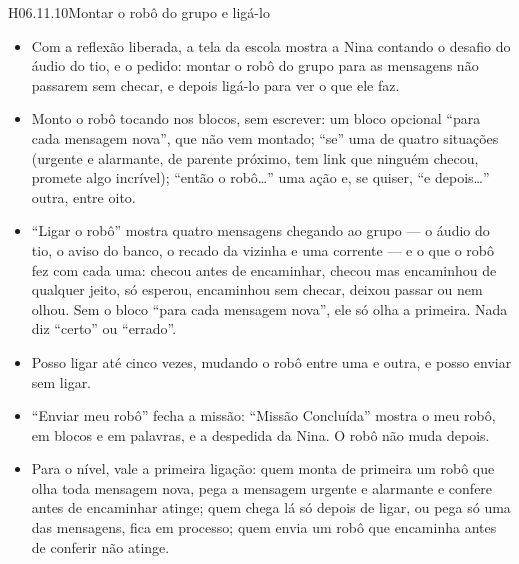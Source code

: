 \begin{historia}{H06.11.10}{Montar o robô do grupo e ligá-lo}{\parcial}
\aceite
\begin{itemize}
  \item Com a reflexão liberada, a tela da escola mostra a Nina contando o
    desafio do áudio do tio, e o pedido: montar o robô do grupo para as
    mensagens não passarem sem checar, e depois ligá-lo para ver o que ele
    faz.
  \item Monto o robô tocando nos blocos, sem escrever: um bloco opcional
    \enquote{para cada mensagem nova}, que não vem montado; \enquote{se} uma
    de quatro situações (urgente e alarmante, de parente próximo, tem link
    que ninguém checou, promete algo incrível); \enquote{então o robô\ldots}
    uma ação e, se quiser, \enquote{e depois\ldots} outra, entre oito.
  \item \enquote{Ligar o robô} mostra quatro mensagens chegando ao grupo --- o
    áudio do tio, o aviso do banco, o recado da vizinha e uma corrente --- e o
    que o robô fez com cada uma: checou antes de encaminhar, checou mas
    encaminhou de qualquer jeito, só esperou, encaminhou sem checar, deixou
    passar ou nem olhou. Sem o bloco \enquote{para cada mensagem nova}, ele
    só olha a primeira. Nada diz \enquote{certo} ou \enquote{errado}.
  \item Posso ligar até cinco vezes, mudando o robô entre uma e outra, e
    posso enviar sem ligar.
  \item \enquote{Enviar meu robô} fecha a missão: \enquote{Missão Concluída}
    mostra o meu robô, em blocos e em palavras, e a despedida da Nina. O
    robô não muda depois.
  \item Para o nível, vale a primeira ligação: quem monta de primeira um
    robô que olha toda mensagem nova, pega a mensagem urgente e alarmante e
    confere antes de encaminhar atinge; quem chega lá só depois de ligar, ou
    pega só uma das mensagens, fica em processo; quem envia um robô que
    encaminha antes de conferir não atinge.
\end{itemize}
\end{historia}



